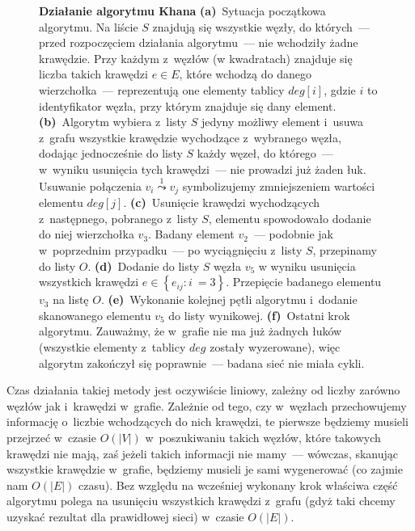 \begin{figure}[!htbp]
\begin{subfigure}[b]{\textwidth}
\begin{subfigure}[b]{0.3\textwidth}
			\caption{}
			\label{fig:exampleKhan:f}
		\end{subfigure}
		\hfill\null
	\end{subfigure}
	\caption{
		\textbf{Działanie algorytmu Khana}
		\textbf{(a)}~Sytuacja początkowa algorytmu.
		Na liście $S$ znajdują się wszystkie węzły, do których~--- przed rozpoczęciem działania algorytmu~--- nie wchodziły żadne krawędzie.
		Przy każdym z~węzłów (w kwadratach) znajduje się liczba takich krawędzi $e \in E$, które wchodzą do danego wierzchołka~--- reprezentują one elementy tablicy $deg \left[ i \right]$, gdzie $i$ to identyfikator węzła, przy którym znajduje się dany element.
		\textbf{(b)}~Algorytm wybiera z~listy $S$ jedyny możliwy element i~usuwa z~grafu wszystkie krawędzie wychodzące z~wybranego węzła, dodając jednocześnie do listy $S$ każdy węzeł, do którego~--- w~wyniku usunięcia tych krawędzi~--- nie prowadzi już żaden łuk.
		Usuwanie połączenia $v_{i} \overset{1} \leadsto v_{j}$ symbolizujemy zmniejszeniem wartości elementu $deg \left[ j \right]$.
		\textbf{(c)}~Usunięcie krawędzi wychodzących z~następnego, pobranego z~listy $S$, elementu spowodowało dodanie do niej wierzchołka $v_{3}$.
		Badany element $v_{2}$~--- podobnie jak w~poprzednim przypadku~--- po wyciągnięciu z~listy $S$, przepinamy do listy $O$.
		\textbf{(d)}~Dodanie do listy $S$ węzła $v_{5}$ w wyniku usunięcia wszystkich krawędzi $e \in \left\{ e_{ij} : i~= 3 \right\}$.
		Przepięcie badanego elementu $v_{3}$ na listę $O$.
		\textbf{(e)}~Wykonanie kolejnej pętli algorytmu i~dodanie skanowanego elementu $v_{5}$ do listy wynikowej.
		\textbf{(f)}~Ostatni krok algorytmu.
		Zauważmy, że w~grafie nie ma już żadnych łuków (wszystkie elementy z~tablicy $deg$ zostały wyzerowane), więc algorytm zakończył się poprawnie~--- badana sieć nie miała cykli.
	}
	\label{fig:exampleKhan}
\end{figure}

Czas działania takiej metody jest oczywiście liniowy, zależny od liczby zarówno węzłów jak i~krawędzi w~grafie.
Zależnie od tego, czy w~węzłach przechowujemy informację o~liczbie wchodzących do nich krawędzi, te pierwsze będziemy musieli przejrzeć w~czasie $O \left( \left| V \right| \right)$ w~poszukiwaniu takich węzłów, które takowych krawędzi nie mają, zaś jeżeli takich informacji nie mamy~--- wówczas, skanując wszystkie krawędzie w~grafie, będziemy musieli je sami wygenerować (co zajmie nam $O \left( \left| E \right| \right)$ czasu).
Bez względu na wcześniej wykonany krok właściwa część algorytmu polega na usunięciu wszystkich krawędzi z~grafu (gdyż taki chcemy uzyskać rezultat dla prawidłowej sieci) w~czasie $O \left( \left| E \right| \right)$.


